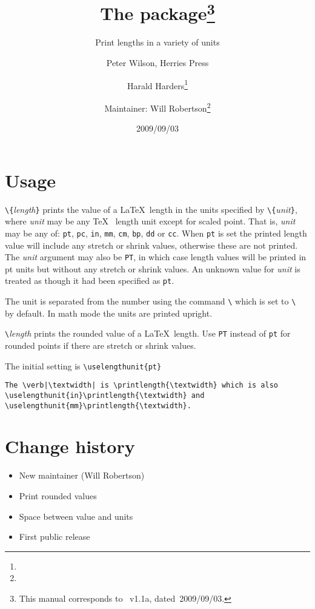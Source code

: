 \documentclass[pagesize=auto, fontsize=12pt, DIV=10]{scrartcl}
\title{The \pkg{printlen} package\thanks{This manual corresponds to \pkg{printlen.sty}~v1.1a, dated~2009/09/03.}}
\subtitle{Print lengths in a variety of units}
\author{Peter Wilson, Herries Press\and Harald Harders\thanks{\mail{h.harders@tu-bs.de}}\and Maintainer: Will Robertson\thanks{\mail{will.robertson@latex-project.org}}}
\date{2009/09/03}
\makeatletter
\newcommand*{\cs}[1]{\texttt{\textbackslash#1}}
\newcommand*{\cmd}[1]{\cs{\expandafter\@gobble\string#1}}
\newcommand*{\meta}[1]{\textlangle\textsl{#1}\textrangle}
\newcommand*{\marg}[1]{\texttt{\{}\meta{#1}\texttt{\}}}
\makeatother
\begin{document}
\maketitle


\section{Usage}

\cmd{\printlength}\marg{length} prints the value of a \LaTeX\ length in the 
units specified by \cmd{\uselengthunit}\marg{unit}, where \meta{unit} may be any \TeX\ %
length unit except for scaled point. That is, \meta{unit} may be any of:
\texttt{pt}, \texttt{pc}, \texttt{in}, \texttt{mm}, \texttt{cm}, \texttt{bp}, \texttt{dd} or \texttt{cc}. When \texttt{pt} is set the printed length
value will include any stretch or shrink values, otherwise these
are not printed. The \meta{unit} argument may also be \texttt{PT}, in which case
length values will be printed in pt units but without any stretch
or shrink values. An unknown value for \meta{unit} is treated as though it
had been specified as \texttt{pt}.

The unit is separated from the number using the command
\cmd{\unitspace} which is set to \cmd{\,} by default. In math mode the units are
printed upright.

\cmd{\rndprintlength}\meta{length} prints the rounded value of a \LaTeX\ length.
Use \texttt{PT} instead of \texttt{pt} for rounded points if there are stretch or
shrink values.

The initial setting is \verb+\uselengthunit{pt}+



\begin{lstlisting}
The \verb|\textwidth| is \printlength{\textwidth} which is also
\uselengthunit{in}\printlength{\textwidth} and
\uselengthunit{mm}\printlength{\textwidth}.
\end{lstlisting}


\section{Change history}


\begin{itemize}
\item New maintainer (Will Robertson)
\end{itemize}
 


\begin{itemize}
\item Print rounded values
\item Space between value and units
\end{itemize}



\begin{itemize}
\item First public release
\end{itemize}
\end{document}
